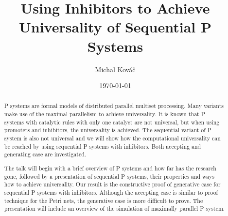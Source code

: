 \documentclass[llncs,submission,copyright,creativecommons]{llncs}
\begin{document}
\title{Using Inhibitors to Achieve Universality of Sequential P Systems}
\author{Michal Kováč}
\date{\today}
\maketitle

\begin{abstract}
P systems are formal models of distributed parallel multiset processing. Many variants make use of the maximal parallelism to achieve universality.
It is known that P systems with catalytic rules with only one catalyst are not universal, but when using promoters and inhibitors, the universality is achieved.
The sequential variant of P system is also not universal and we will show how the computational universality can be reached by using sequential P systems with inhibitors. Both accepting and generating case are investigated.

The talk will begin with a brief overview of P systems and how far has the research gone, followed by a presentation of sequential P systems, their properties and ways how to achieve universality. Our result is the constructive proof of generative case for sequential P systems with inhibitors. Although the accepting case is similar to proof technique for the Petri nets, the generative case is more difficult to prove. The presentation will include an overview of the simulation of maximally parallel P system.
\end{abstract}
\end{document}

